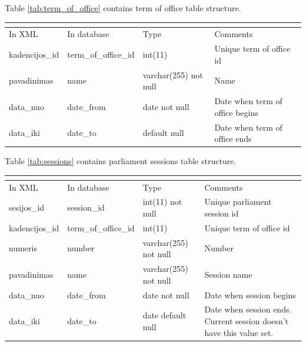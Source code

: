 \documentclass[a4paper,12pt]{article}
\begin{document}
	\noindent
	Table \ref{tab:term_of_office} contains term of office table structure.
	\begin{center}
	 	\begin{tabular}{L{3cm} L{3cm} L{2.2cm} L{3.8cm}}
	 		\\ 
	 		\hline
	 		In XML & In database & Type & Comments\\
	 		\hline 
	 		kadencijos\_id & term\_of\_office\_id & int(11) & Unique term of office id \\ 
	 		pavadinimas & name & varchar(255) not null & Name \\
	 		data\_nuo & date\_from & date not null & Date when term of office begins \\ 
	 		data\_iki & date\_to & default null & Date when term of office ends \\
	 		\hline
	 	\end{tabular}
	 	 \label{tab:term_of_office}
	\end{center}

	\hfill
	
	
	\noindent
	Table \ref{tab:sessions} contains parliament sessions table structure.
	\begin{center}
		\begin{tabular}{L{3cm} L{3cm} L{2.2cm} L{3.8cm}}
			\\ 
			\hline
			In XML & In database & Type & Comments\\
			\hline 
			sesijos\_id & session\_id & int(11) not null & Unique parliament session id \\
			kadencijos\_id & term\_of\_office\_id & int(11) & Unique term of office id \\ 
			numeris & number & varchar(255) not null & Number \\ 
			pavadinimas & name & varchar(255) not null & Session name \\ 
			data\_nuo & date\_from & date not null & Date when session begins \\
			data\_iki & date\_to & date default null & Date when session ends. Current session doesn't have this value set. \\
			\hline
		\end{tabular}
		 \label{tab:sessions}
	\end{center}
	
	\hfill
	
\end{document}
